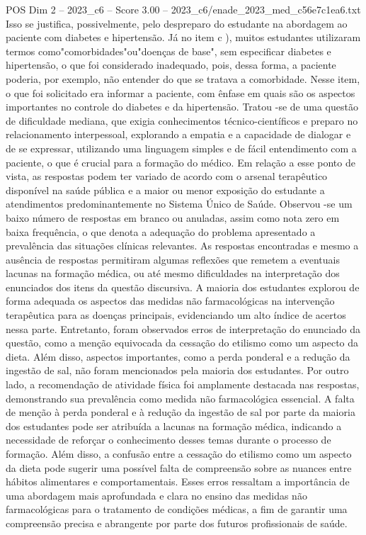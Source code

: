 \begin{textsample}{POS Dim 2 – 2023\_c6 – Score 3.00 – 2023\_c6/enade\_2023\_med\_c56e7c1ea6.txt}
Isso se justifica, possivelmente, pelo despreparo do estudante na abordagem ao paciente com diabetes e hipertensão.
Já no item c ), muitos estudantes utilizaram termos como"comorbidades"ou"doenças de base", sem especificar diabetes e hipertensão, o que foi considerado inadequado, pois, dessa forma, a paciente poderia, por exemplo, não entender do que se tratava a comorbidade.
Nesse item, o que foi solicitado era informar a paciente, com ênfase em quais são os aspectos importantes no controle do diabetes e da hipertensão.
Tratou -se de uma questão de dificuldade mediana, que exigia conhecimentos técnico-científicos e preparo no relacionamento interpessoal, explorando a empatia e a capacidade de dialogar e de se expressar, utilizando uma linguagem simples e de fácil entendimento com a paciente, o que é crucial para a formação do médico.
Em relação a esse ponto de vista, as respostas podem ter variado de acordo com o arsenal terapêutico disponível na saúde pública e a maior ou menor exposição do estudante a atendimentos predominantemente no Sistema Único de Saúde.
Observou -se um baixo número de respostas em branco ou anuladas, assim como nota zero em baixa frequência, o que denota a adequação do problema apresentado a prevalência das situações clínicas relevantes.
As respostas encontradas e mesmo a ausência de respostas permitiram algumas reflexões que remetem a eventuais lacunas na formação médica, ou até mesmo dificuldades na interpretação dos enunciados dos itens da questão discursiva.
A maioria dos estudantes explorou de forma adequada os aspectos das medidas não farmacológicas na intervenção terapêutica para as doenças principais, evidenciando um alto índice de acertos nessa parte.
Entretanto, foram observados erros de interpretação do enunciado da questão, como a menção equivocada da cessação do etilismo como um aspecto da dieta.
Além disso, aspectos importantes, como a perda ponderal e a redução da ingestão de sal, não foram mencionados pela maioria dos estudantes.
Por outro lado, a recomendação de atividade física foi amplamente destacada nas respostas, demonstrando sua prevalência como medida não farmacológica essencial.
A falta de menção à perda ponderal e à redução da ingestão de sal por parte da maioria dos estudantes pode ser atribuída a lacunas na formação médica, indicando a necessidade de reforçar o conhecimento desses temas durante o processo de formação.
Além disso, a confusão entre a cessação do etilismo como um aspecto da dieta pode sugerir uma possível falta de compreensão sobre as nuances entre hábitos alimentares e comportamentais.
Esses erros ressaltam a importância de uma abordagem mais aprofundada e clara no ensino das medidas não farmacológicas para o tratamento de condições médicas, a fim de garantir uma compreensão precisa e abrangente por parte dos futuros profissionais de saúde.

\end{textsample}

